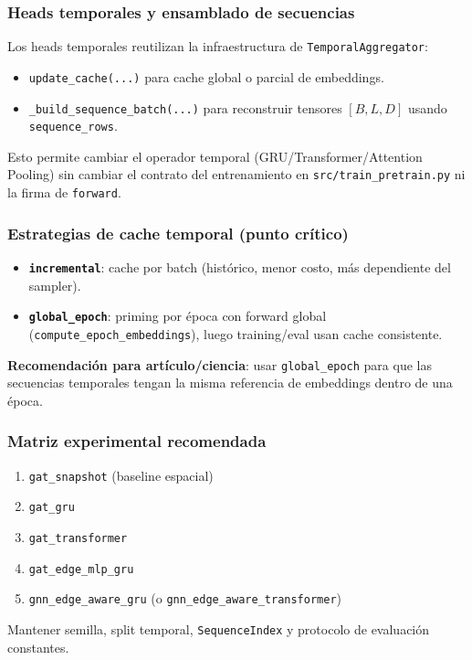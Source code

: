 \subsubsection{Heads temporales y ensamblado de secuencias}
Los heads temporales reutilizan la infraestructura de \texttt{TemporalAggregator}:
\begin{itemize}[leftmargin=*]
  \item \texttt{update\_cache(...)} para cache global o parcial de embeddings.
  \item \texttt{\_build\_sequence\_batch(...)} para reconstruir tensores \([B, L, D]\) usando \texttt{sequence\_rows}.
\end{itemize}
Esto permite cambiar el operador temporal (GRU/Transformer/Attention Pooling) sin cambiar el
contrato del entrenamiento en \texttt{src/train\_pretrain.py} ni la firma de \texttt{forward}.

\subsubsection{Estrategias de cache temporal (punto cr\'itico)}
\begin{itemize}[leftmargin=*]
  \item \textbf{\texttt{incremental}}: cache por batch (hist\'orico, menor costo, m\'as dependiente del sampler).
  \item \textbf{\texttt{global\_epoch}}: priming por \'epoca con forward global (\texttt{compute\_epoch\_embeddings}), luego training/eval usan cache consistente.
\end{itemize}
\textbf{Recomendaci\'on para art\'iculo/ciencia}: usar \texttt{global\_epoch} para que las secuencias
temporales tengan la misma referencia de embeddings dentro de una \'epoca.

\subsubsection{Matriz experimental recomendada}
\begin{enumerate}[leftmargin=*]
  \item \texttt{gat\_snapshot} (baseline espacial)
  \item \texttt{gat\_gru}
  \item \texttt{gat\_transformer}
  \item \texttt{gat\_edge\_mlp\_gru}
  \item \texttt{gnn\_edge\_aware\_gru} (o \texttt{gnn\_edge\_aware\_transformer})
\end{enumerate}
Mantener semilla, split temporal, \texttt{SequenceIndex} y protocolo de evaluaci\'on constantes.

